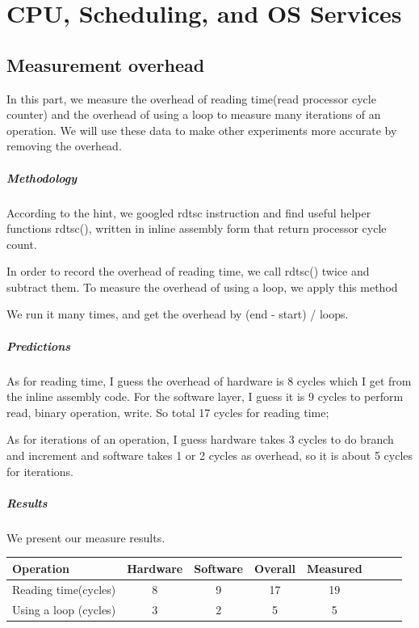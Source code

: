 \chapter{CPU, Scheduling, and OS Services}

\section{Measurement overhead}
In this part, we measure the overhead of reading time(read processor cycle counter) and the overhead of using a loop to measure many iterations of an operation. We will use these data to make other experiments more accurate by removing the overhead.

\paragraph{Methodology}
According to the hint, we googled rdtsc instruction and find useful helper functions rdtsc()\cite{rdtsc}, written in inline assembly form that return processor cycle count. 

In order to record the overhead of reading time, we call rdtsc() twice and subtract them. To measure the overhead of using a loop, we apply this method

We run it many times, and get the overhead by (end - start) / loops.

\paragraph{Predictions}
As for reading time, I guess the overhead of hardware is 8 cycles which I get from the inline assembly code. For the software layer, I guess it is 9 cycles to perform read, binary operation, write. So total 17 cycles for reading time; 

As for iterations of an operation, I guess hardware takes 3 cycles to do branch and increment and software takes 1 or 2 cycles as overhead, so it is about 5 cycles for iterations.

\paragraph{Results}
We present our measure results.

\begin{center}
\begin{tabular}{l*{6}{c}r}
Operation              & Hardware  & Software  & Overall  & Measured   \\
\hline
Reading time(cycles) & 8 & 9 & 17 & 19  \\
Using a loop (cycles)           & 3 & 2 & 5 & 5 \\
\end{tabular}
\end{center}

